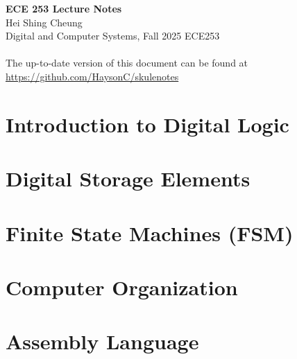 \documentclass[11pt]{article}
\begin{document}
\thispagestyle{empty}
{\LARGE \bf ECE 253 Lecture Notes}\\
{\large Hei Shing Cheung}\\
Digital and Computer Systems, Fall 2025 \hfill ECE253\\
\\
The up-to-date version of this document can be found at \url{https://github.com/HaysonC/skulenotes}\\

\section{Introduction to Digital Logic}

\section{Digital Storage Elements}

\section{Finite State Machines (FSM)}

\section{Computer Organization}

\section{Assembly Language}
\end{document}
